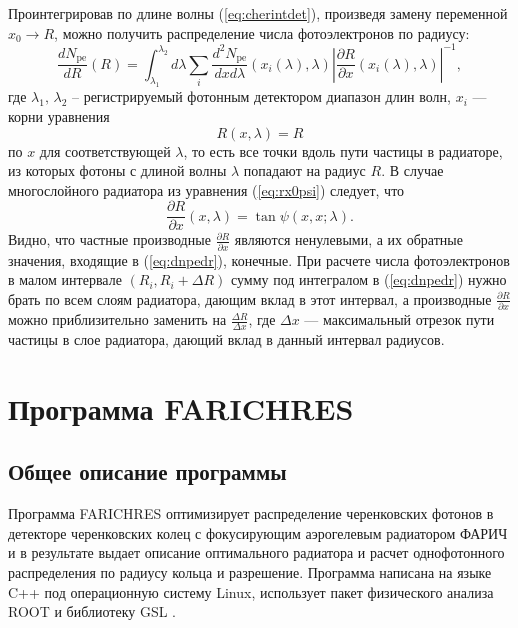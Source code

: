 \documentclass[12pt]{article}
\begin{document}
Проинтегрировав по длине волны (\ref{eq:cherintdet}), произведя замену переменной $x_0\to R$, можно получить распределение числа фотоэлектронов по радиусу:
\begin{equation}
\frac{dN_\mathrm{pe}}{dR}(R) = \int_{\lambda_1}^{\lambda_2} d\lambda \sum_i \frac{d^2N_\mathrm{pe}}{dx d\lambda}(x_i(\lambda),\lambda)
\left|\frac{\partial R}{\partial x}(x_i(\lambda),\lambda)\right|^{-1},
\label{eq:dnpedr}
\end{equation}
где $\lambda_1,\,\lambda_2$ -- регистрируемый фотонным детектором диапазон длин волн, $x_i$ --- корни уравнения 
\[R(x,\lambda)=R\] 
по $x$ для соответствующей $\lambda$, то есть все точки вдоль пути частицы в радиаторе, из которых фотоны с длиной волны 
$\lambda$ попадают на радиус $R$. В случае многослойного радиатора из уравнения (\ref{eq:rx0psi}) следует, что
\[\frac{\partial R}{\partial x}(x,\lambda) = \tan\psi(x,x;\lambda).\]
Видно, что частные производные $\frac{\partial R}{\partial x}$ являются ненулевыми, а их обратные значения, входящие в (\ref{eq:dnpedr}), конечные. 
При расчете числа фотоэлектронов в малом интервале $(R_i,R_i+\Delta R)$ сумму под интегралом в (\ref{eq:dnpedr}) нужно брать по всем слоям радиатора, дающим вклад в этот 
интервал, а производные $\frac{\partial R}{\partial x}$ можно приблизительно заменить на $\frac{\Delta R}{\Delta x}$, где $\Delta x$ --- максимальный отрезок пути частицы 
в слое радиатора, дающий вклад в данный интервал радиусов.

\section{Программа FARICHRES}
\subsection{Общее описание программы}
Программа FARICHRES оптимизирует распределение черенковских фотонов в детекторе 
черенковских колец с фокусирующим аэрогелевым радиатором ФАРИЧ и в результате выдает описание оптимального радиатора и 
расчет однофотонного распределения по радиусу кольца и разрешение. 
Программа написана на языке C++ под операционную систему Linux, использует пакет физического анализа ROOT \cite{root} и библиотеку GSL \cite{gsl}.
\end{document}

